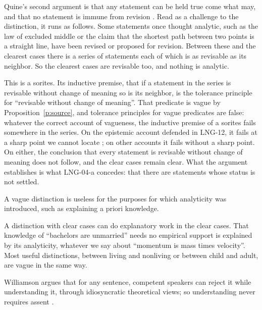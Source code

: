 \documentclass{situationist-preprint}
\begin{document}
Quine's second argument is that any statement can be held true come what may, and that no statement is immune from revision \citep{Quine1951}. Read as a challenge to the distinction, it runs as follows. Some statements once thought analytic, such as the law of excluded middle or the claim that the shortest path between two points is a straight line, have been revised or proposed for revision. Between these and the clearest cases there is a series of statements each of which is as revisable as its neighbor. So the clearest cases are revisable too, and nothing is analytic.

This is a sorites. Its inductive premise, that if a statement in the series is revisable without change of meaning so is its neighbor, is the tolerance principle for \enquote{revisable without change of meaning}. That predicate is vague by Proposition~\ref{p:source}, and tolerance principles for vague predicates are false: whatever the correct account of vagueness, the inductive premise of a sorites fails somewhere in the series. On the epistemic account defended in LNG-12, it fails at a sharp point we cannot locate \citep{Williamson1994}; on other accounts it fails without a sharp point. On either, the conclusion that every statement is revisable without change of meaning does not follow, and the clear cases remain clear. What the argument establishes is what LNG-04-a concedes: that there are statements whose status is not settled.

\begin{objection}
A vague distinction is useless for the purposes for which analyticity was introduced, such as explaining a priori knowledge.
\end{objection}

\begin{reply}
A distinction with clear cases can do explanatory work in the clear cases. That knowledge of \enquote{bachelors are unmarried} needs no empirical support is explained by its analyticity, whatever we say about \enquote{momentum is mass times velocity}. Most useful distinctions, between living and nonliving or between child and adult, are vague in the same way.
\end{reply}

\begin{objection}
Williamson argues that for any sentence, competent speakers can reject it while understanding it, through idiosyncratic theoretical views; so understanding never requires assent \citep{Williamson2007}.
\end{objection}
\end{document}

